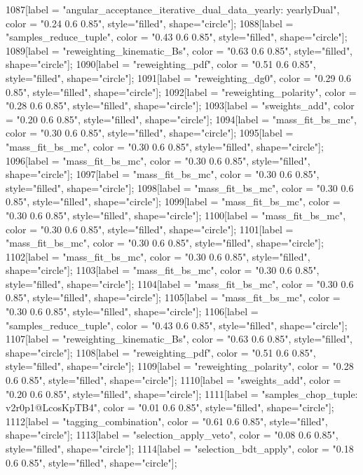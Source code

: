 {	1087[label = "angular_acceptance_iterative_dual_data_yearly\nangacc: yearlyDual", color = "0.24 0.6 0.85", style="filled", shape="circle"];
	1088[label = "samples_reduce_tuple", color = "0.43 0.6 0.85", style="filled", shape="circle"];
	1089[label = "reweighting_kinematic_Bs", color = "0.63 0.6 0.85", style="filled", shape="circle"];
	1090[label = "reweighting_pdf", color = "0.51 0.6 0.85", style="filled", shape="circle"];
	1091[label = "reweighting_dg0", color = "0.29 0.6 0.85", style="filled", shape="circle"];
	1092[label = "reweighting_polarity", color = "0.28 0.6 0.85", style="filled", shape="circle"];
	1093[label = "sweights_add", color = "0.20 0.6 0.85", style="filled", shape="circle"];
	1094[label = "mass_fit_bs_mc", color = "0.30 0.6 0.85", style="filled", shape="circle"];
	1095[label = "mass_fit_bs_mc", color = "0.30 0.6 0.85", style="filled", shape="circle"];
	1096[label = "mass_fit_bs_mc", color = "0.30 0.6 0.85", style="filled", shape="circle"];
	1097[label = "mass_fit_bs_mc", color = "0.30 0.6 0.85", style="filled", shape="circle"];
	1098[label = "mass_fit_bs_mc", color = "0.30 0.6 0.85", style="filled", shape="circle"];
	1099[label = "mass_fit_bs_mc", color = "0.30 0.6 0.85", style="filled", shape="circle"];
	1100[label = "mass_fit_bs_mc", color = "0.30 0.6 0.85", style="filled", shape="circle"];
	1101[label = "mass_fit_bs_mc", color = "0.30 0.6 0.85", style="filled", shape="circle"];
	1102[label = "mass_fit_bs_mc", color = "0.30 0.6 0.85", style="filled", shape="circle"];
	1103[label = "mass_fit_bs_mc", color = "0.30 0.6 0.85", style="filled", shape="circle"];
	1104[label = "mass_fit_bs_mc", color = "0.30 0.6 0.85", style="filled", shape="circle"];
	1105[label = "mass_fit_bs_mc", color = "0.30 0.6 0.85", style="filled", shape="circle"];
	1106[label = "samples_reduce_tuple", color = "0.43 0.6 0.85", style="filled", shape="circle"];
	1107[label = "reweighting_kinematic_Bs", color = "0.63 0.6 0.85", style="filled", shape="circle"];
	1108[label = "reweighting_pdf", color = "0.51 0.6 0.85", style="filled", shape="circle"];
	1109[label = "reweighting_polarity", color = "0.28 0.6 0.85", style="filled", shape="circle"];
	1110[label = "sweights_add", color = "0.20 0.6 0.85", style="filled", shape="circle"];
	1111[label = "samples_chop_tuple\nversion: v2r0p1@LcosKpTB4", color = "0.01 0.6 0.85", style="filled", shape="circle"];
	1112[label = "tagging_combination", color = "0.61 0.6 0.85", style="filled", shape="circle"];
	1113[label = "selection_apply_veto", color = "0.08 0.6 0.85", style="filled", shape="circle"];
	1114[label = "selection_bdt_apply", color = "0.18 0.6 0.85", style="filled", shape="circle"];
}
